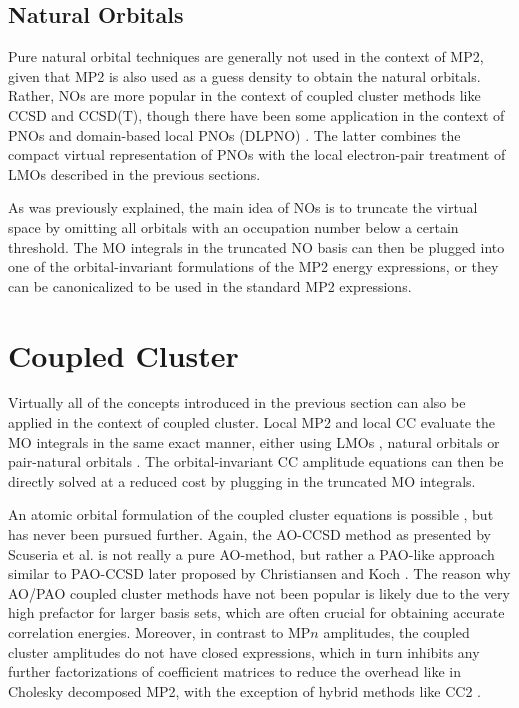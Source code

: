 
\subsection{Natural Orbitals}

Pure natural orbital techniques are generally not used in the context of MP2, given that MP2 is also used as a guess density to obtain the natural orbitals. Rather, NOs are more popular in the context of coupled cluster methods like CCSD and CCSD(T), though there have been some application in the context of PNOs \cite{Fra2017,Sch2013} and domain-based local PNOs (DLPNO) \cite{Wer2015,Pin2018}. The latter combines the compact virtual representation of PNOs with the local electron-pair treatment of LMOs   described in the previous sections. 

As was previously explained, the main idea of NOs is to truncate the virtual space by omitting all orbitals with an occupation number below a certain threshold. The MO integrals in the truncated NO basis can then be plugged into one of the orbital-invariant formulations of the MP2 energy expressions, or they can be canonicalized to be used in the standard MP2 expressions.

\section{Coupled Cluster}

Virtually all of the concepts introduced in the previous section can also be applied in the context of coupled cluster. Local MP2 and local CC evaluate the MO integrals in the same exact manner, either using LMOs \cite{Sch2001, Sch2002, Sch2000a, Sch2000b,Sch2001}, natural orbitals \cite{Tau2008,Nag2018,Rol2013} or pair-natural orbitals \cite{Nee2009a,Guo2018,Sch2017,Rip2013}. The orbital-invariant CC amplitude equations can then be directly solved at a reduced cost by plugging in the truncated MO integrals.

An atomic orbital formulation of the coupled cluster equations is possible \cite{Scu1999}, but has never been pursued further. Again, the AO-CCSD method as presented by Scuseria et al. is not really a pure AO-method, but rather a PAO-like approach similar to PAO-CCSD later proposed by Christiansen and Koch \cite{Chr2006}. The reason why AO/PAO coupled cluster methods have not been popular is likely due to the very high prefactor for larger basis sets, which are often crucial for obtaining accurate correlation energies. Moreover, in contrast to MP$n$ amplitudes, the coupled cluster amplitudes do not have closed expressions, which in turn inhibits any further factorizations of coefficient matrices to reduce the overhead like in Cholesky decomposed MP2, with the exception of hybrid methods like CC2 \cite{Sac2021}.

